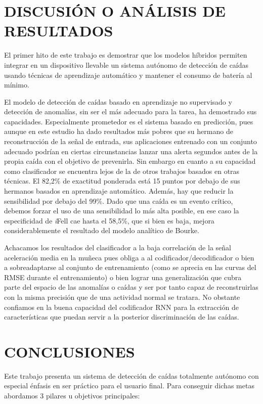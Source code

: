 \documentclass[11pt,a4paper,spanish,twocolumn]{article}
\def\ifell/{\textsl{\textsf{i}}\textsf{Fell}}
\begin{document}
\section{DISCUSIÓN O ANÁLISIS DE RESULTADOS}

El primer hito de este trabajo es demostrar que los modelos híbridos permiten integrar en un dispositivo llevable un sistema autónomo de detección de caídas usando técnicas de aprendizaje automático y mantener el consumo de batería al mínimo. 

El modelo de detección de caídas basado en aprendizaje no supervisado y detección de anomalías, sin ser el más adecuado para la tarea, ha demostrado sus capacidades. Especialmente prometedor es el sistema basado en predicción, pues aunque en este estudio ha dado resultados más pobres que su hermano de reconstrucción de la señal de entrada, sus aplicaciones entrenado con un conjunto adecuado podrían en ciertas circunstancias lanzar una alerta segundos antes de la propia caída con el objetivo de prevenirla. 
Sin embargo en cuanto a su capacidad como clasificador se encuentra lejos de la de otros trabajos basados en otras técnicas. El 82,2\% de exactitud ponderada está 15 puntos por debajo de sus hermanos basados en aprendizaje automático. Además, hay que reducir la sensibilidad por debajo del 99\%. Dado que una caída es un evento crítico, debemos forzar el uso de una sensibilidad lo más alta posible, en ese caso la especificidad de \ifell/ cae hasta el 58,5\%, que si bien es baja, mejora considerablemente el resultado del modelo analítico de Bourke. 

Achacamos los resultados del clasificador a la baja correlación de la señal aceleración media en la muñeca pues obliga a al codificador/decodificador o bien a sobreadaptarse al conjunto de entrenamiento (como se aprecia en las curvas del RMSE durante el entrenamiento) o bien lograr una generalización que cubra parte del espacio de las anomalías o caídas y ser por tanto capaz de reconstruirlas con la misma precisión que de una actividad normal se tratara. No obstante confiamos en la buena capacidad del codificador RNN para la extracción de características que puedan servir a la posterior discriminación de las caídas. 


\section{CONCLUSIONES}
Este trabajo presenta un sistema de detección de caídas totalmente autónomo con especial énfasis en ser práctico para el usuario final. Para conseguir dichas metas abordamos 3 pilares u objetivos principales:
\end{document}
